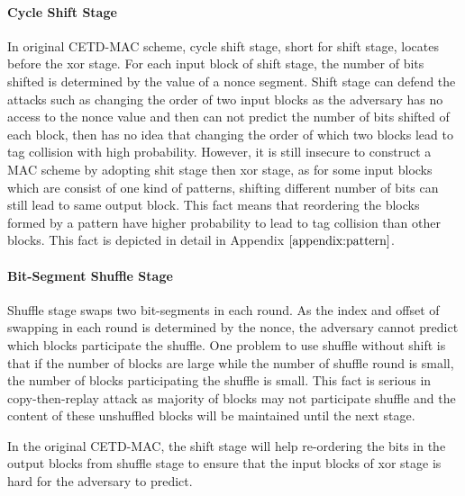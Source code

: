 \paragraph{Cycle Shift Stage}
In original CETD-MAC scheme, cycle shift stage, short for shift stage, locates before the xor stage. For each input block of shift stage, the number of bits shifted is determined by the value of a nonce segment. Shift stage can defend the attacks such as changing the order of two input blocks as the adversary has no access to the nonce value and then can not predict the number of bits shifted of each block, then has no idea that changing the order of which two blocks lead to tag collision with high probability. However, it is still insecure to construct a MAC scheme by adopting shit stage then xor stage, as for some input blocks which are consist of one kind of patterns, shifting different number of bits can still lead to same output block. This fact means that reordering the blocks formed by a pattern have higher probability to lead to tag collision than other blocks. This fact is depicted in detail in Appendix $\ref{appendix:pattern}$. 

\paragraph{Bit-Segment Shuffle Stage}
Shuffle stage swaps two bit-segments in each round. As the index and offset of swapping in each round is determined by the nonce, the adversary cannot predict which blocks participate the shuffle. One problem to use shuffle without shift is that if the number of blocks are large while the number of shuffle round is small, the number of blocks participating the shuffle is small. This fact is serious in copy-then-replay attack as majority of blocks may not participate shuffle and the content of these unshuffled blocks will be maintained until the next stage. %

 In the original CETD-MAC, the shift stage will help re-ordering the bits in the output blocks from shuffle stage to ensure that the input blocks of xor stage is hard for the adversary to predict. 

